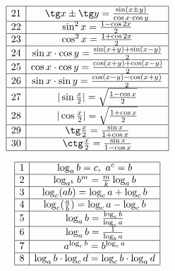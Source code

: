 \documentclass{article}
\begin{document}
\begin{displaymath}
\begin{array}{|c|c|}

  \hline
  21&\tg x \pm \tg y = \frac{\sin (x \pm y)}{\cos x \cdot \cos y}\\
  \hline
  22&\sin^2 x = \frac{1 - \cos 2x}{2}\\
  \hline
  23&\cos^2 x = \frac{1 + \cos 2x}{2}\\
  \hline
  24&\sin x \cdot \cos y = \frac{\sin (x+y) + \sin (x-y)}{2}\\
  \hline
  25&\cos x \cdot \cos y = \frac{\cos (x+y) + \cos (x-y)}{2}\\
  \hline
  26&\sin x \cdot \sin y = \frac{\cos (x-y) - \cos (x+y)}{2}\\
  \hline
  27&|\sin \frac{x}{2}| = \sqrt{\frac{1 - \cos x}{2}}\\
  \hline
  28&|\cos \frac{x}{2}| = \sqrt{\frac{1 + \cos x}{2}}\\
  \hline
  29&\tg \frac{x}{2} = \frac{\sin x}{1 + \cos x}\\
  \hline
  30&\ctg \frac{x}{2} = \frac{\sin x}{1 - \cos x}\\
  \hline
\end{array} 
\end{displaymath}

\begin{displaymath}
\begin{array}{|c|c|}
  \hline
  1&\log_{a}b = c, ~ a^c = b\\
  \hline
  2&\log_{a^k}b^m = \frac{m}{k}\log_{a}b\\
  \hline
  3&\log_{c}(ab) = \log_{c}a + \log_{c}b\\
  \hline
  4&\log_{c}(\frac{a}{b}) = \log_{c}a - \log_{c}b\\ 
  \hline
  5&\log_{a}b = \frac{\log_{c}b}{\log_{c}a}\\
  \hline
  6&\log_{a}b = \frac{1}{\log_{b}a}\\
  \hline  
  7&a^{\log_{c}b} = b^{\log_{c}a}\\
  \hline
  8&\log_{a}b \cdot \log_{c}d = \log_{c}b \cdot \log_{a}d\\
  \hline    
\end{array} 
\end{displaymath}
\end{document}
